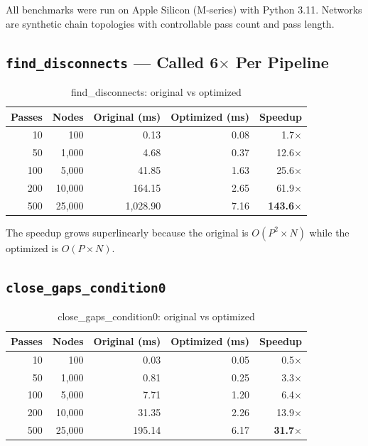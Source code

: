 \documentclass[11pt,a4paper]{article}
\begin{document}
All benchmarks were run on Apple Silicon (M-series) with Python 3.11. Networks are synthetic chain topologies with controllable pass count and pass length.

\subsection{\texttt{find\_disconnects} --- Called 6$\times$ Per Pipeline}

\begin{table}[H]
\centering
\caption{find\_disconnects: original vs optimized}
\begin{tabular}{rrrrr}
\toprule
\textbf{Passes} & \textbf{Nodes} & \textbf{Original (ms)} & \textbf{Optimized (ms)} & \textbf{Speedup} \\
\midrule
10 & 100 & 0.13 & 0.08 & 1.7$\times$ \\
50 & 1,000 & 4.68 & 0.37 & 12.6$\times$ \\
100 & 5,000 & 41.85 & 1.63 & 25.6$\times$ \\
200 & 10,000 & 164.15 & 2.65 & 61.9$\times$ \\
500 & 25,000 & 1,028.90 & 7.16 & \textbf{143.6$\times$} \\
\bottomrule
\end{tabular}
\end{table}

The speedup grows superlinearly because the original is $O(P^2 \times N)$ while the optimized is $O(P \times N)$.

\subsection{\texttt{close\_gaps\_condition0}}

\begin{table}[H]
\centering
\caption{close\_gaps\_condition0: original vs optimized}
\begin{tabular}{rrrrr}
\toprule
\textbf{Passes} & \textbf{Nodes} & \textbf{Original (ms)} & \textbf{Optimized (ms)} & \textbf{Speedup} \\
\midrule
10 & 100 & 0.03 & 0.05 & 0.5$\times$ \\
50 & 1,000 & 0.81 & 0.25 & 3.3$\times$ \\
100 & 5,000 & 7.71 & 1.20 & 6.4$\times$ \\
200 & 10,000 & 31.35 & 2.26 & 13.9$\times$ \\
500 & 25,000 & 195.14 & 6.17 & \textbf{31.7$\times$} \\
\bottomrule
\end{tabular}
\end{table}
\end{document}
